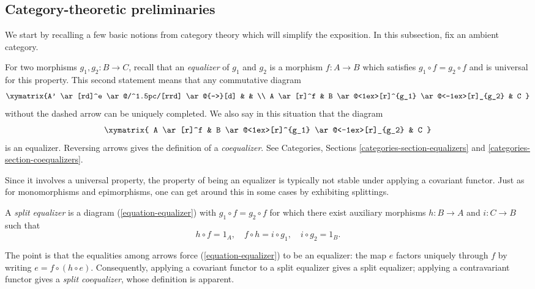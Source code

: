 \subsection{Category-theoretic preliminaries}
\label{subsection-category-prelims}

\noindent
We start by recalling a few basic notions from category theory which will 
simplify the exposition. In this subsection, fix an ambient category.

\medskip\noindent
For two morphisms $g_1, g_2: B \to C$, recall that an {\it equalizer}
of $g_1$ and $g_2$  is a morphism $f: A \to B$ which satisfies
$g_1 \circ f = g_2 \circ f$ and is universal for this property.
This second statement means that any commutative diagram 
$$
\xymatrix{A' \ar[rd]^e \ar@/^1.5pc/[rrd] \ar@{-->}[d] & & \\
A \ar[r]^f & B \ar@<1ex>[r]^{g_1} \ar@<-1ex>[r]_{g_2} & 
C
}
$$
without the dashed arrow can be uniquely completed. We also say in this 
situation that the diagram
\begin{equation}
\label{equation-equalizer}
\xymatrix{
A \ar[r]^f  & B \ar@<1ex>[r]^{g_1} \ar@<-1ex>[r]_{g_2} & C
}
\end{equation}
is an equalizer. Reversing arrows gives the definition of a {\it coequalizer}.
See Categories, Sections \ref{categories-section-equalizers} and
\ref{categories-section-coequalizers}.

\medskip\noindent
Since it involves a universal property, the property of being an equalizer is 
typically not stable under applying a covariant functor. Just as for
monomorphisms and epimorphisms, one can get around this in some
cases by exhibiting splittings.

\begin{definition}
\label{definition-split-equalizer}
A {\it split equalizer} is a diagram (\ref{equation-equalizer}) with
$g_1 \circ f = g_2 \circ f$ for which there exist auxiliary morphisms
$h : B \to A$ and $i : C \to B$ such that
\begin{equation}
\label{equation-split-equalizer-conditions}
h \circ f = 1_A, \quad f \circ h = i \circ g_1, \quad i \circ g_2 = 1_B.
\end{equation}
\end{definition}

\noindent
The point is that the equalities among arrows force (\ref{equation-equalizer}) 
to be an equalizer: the map $e$ factors uniquely through $f$ by writing
$e = f \circ (h \circ e)$. Consequently, applying a covariant functor
to a split equalizer gives a split equalizer; applying a contravariant functor 
gives a {\it split coequalizer}, whose definition is apparent.

